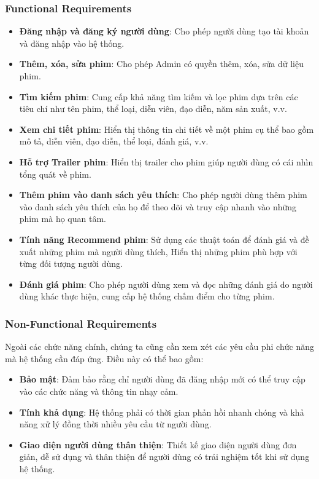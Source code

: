 \documentclass[12pt]{article}
\begin{document}
\subsubsection{Functional Requirements}
\begin{itemize}
    \item \textbf{Đăng nhập và đăng ký người dùng}: Cho phép người dùng tạo tài khoản và đăng nhập vào hệ thống.
    \item \textbf{Thêm, xóa, sửa phim}: Cho phép Admin có quyền thêm, xóa, sửa dữ liệu phim.
    \item \textbf{Tìm kiếm phim}: Cung cấp khả năng tìm kiếm và lọc phim dựa trên các tiêu chí như tên phim, thể loại, diễn viên, đạo diễn, năm sản xuất, v.v.
    \item \textbf{Xem chi tiết phim}: Hiển thị thông tin chi tiết về một phim cụ thể bao gồm mô tả, diễn viên, đạo diễn, thể loại, đánh giá, v.v.
    \item \textbf{Hỗ trợ Trailer phim}: Hiển thị trailer cho phim giúp người dùng có cái nhìn tổng quát về phim.
    \item \textbf{Thêm phim vào danh sách yêu thích}: Cho phép người dùng thêm phim vào danh sách yêu thích của họ để theo dõi và truy cập nhanh vào những phim mà họ quan tâm.
    \item \textbf{Tính năng Recommend phim}: Sử dụng các thuật toán để đánh giá và đề xuất những phim mà người dùng thích, Hiển thị những phim phù hợp với từng đối tượng người dùng.
    \item \textbf{Đánh giá phim}: Cho phép người dùng xem và đọc những đánh giá do người dùng khác thực hiện, cung cấp hệ thống chấm điểm cho từng phim.
\end{itemize}
\subsubsection{Non-Functional Requirements}
Ngoài các chức năng chính, chúng ta cũng cần xem xét các yêu cầu phi chức năng mà hệ thống cần đáp ứng. Điều này có thể bao gồm:
\begin{itemize}
    \item \textbf{Bảo mật}: Đảm bảo rằng chỉ người dùng đã đăng nhập mới có thể truy cập vào các chức năng và thông tin nhạy cảm.
    \item \textbf{Tính khả dụng}: Hệ thống phải có thời gian phản hồi nhanh chóng và khả năng xử lý đồng thời nhiều yêu cầu từ người dùng.
    \item \textbf{Giao diện người dùng thân thiện}: Thiết kế giao diện người dùng đơn giản, dễ sử dụng và thân thiện để người dùng có trải nghiệm tốt khi sử dụng hệ thống.
\end{itemize}
\end{document}
